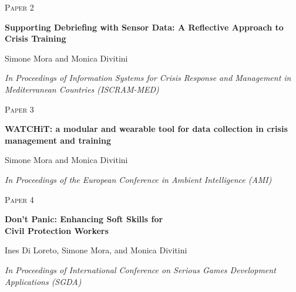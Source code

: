 \cleardoublepage
\begin{flushright}
\textsc{\huge Paper 2}
\end{flushright}
\vspace{3cm}
\begin{center}
	\begin{framed}
		{\Large \textbf{Supporting Debriefing with Sensor Data: A Reflective Approach to Crisis Training}}	
		\medskip
		
		Simone Mora and Monica Divitini
		
		\medskip		
		\emph{In Proceedings of Information Systems for Crisis Response and Management in Mediterranean Countries (ISCRAM-MED)}
	\end{framed}	
\end{center}
\cleardoublepage


\cleardoublepage
\begin{flushright}
\textsc{\huge Paper 3}
\end{flushright}
\vspace{3cm}
\begin{center}
	\begin{framed}
		{\Large \textbf{WATCHiT: a modular and wearable tool for data collection in crisis management and training}}	
		\medskip
		
		Simone Mora and Monica Divitini
		
		\medskip		
		\emph{In Proceedings of the European Conference in Ambient Intelligence (AMI)}
	\end{framed}	
\end{center}
\cleardoublepage


\cleardoublepage
\begin{flushright}
\textsc{\huge Paper 4}
\end{flushright}
\vspace{3cm}
\begin{center}
	\begin{framed}
		{\Large \textbf{Don’t Panic: Enhancing Soft Skills for\\ Civil Protection Workers}}	
		\medskip
		
		Ines Di Loreto, Simone Mora, and Monica Divitini
		
		\medskip		
		\emph{In Proceedings of International Conference on Serious Games Development Applications (SGDA)}
	\end{framed}	
\end{center}
\cleardoublepage


